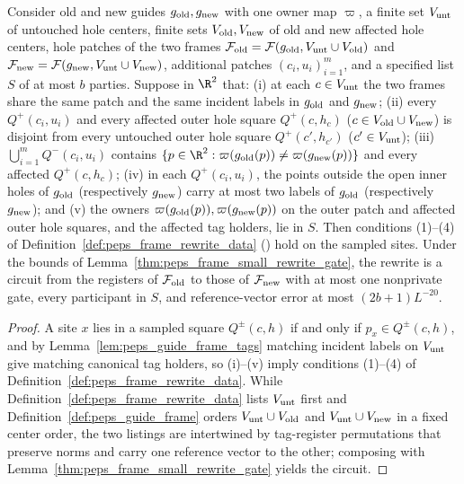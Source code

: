 \begin{lemma}
    \label{thm:peps_guide_frame_rewrite}
    \leanok
    Consider old and new guides $g_{\rm old},g_{\rm new}$ with one owner map $\varpi$, a
    finite set $V_{\rm unt}$ of untouched hole centers, finite sets $V_{\rm old},V_{\rm new}$ of old and new affected
    hole centers, hole patches of the two frames $\mathcal F_{\rm old}=\mathcal F(g_{\rm old},V_{\rm unt}\cup V_{\rm old})$ and $\mathcal F_{\rm new}=\mathcal F(g_{\rm new},V_{\rm unt}\cup V_{\rm new})$, additional
    patches $(c_i,u_i)_{i=1}^m$, and a specified list $S$ of at most $b$ parties. Suppose in $\R^2$ that:
    (i) at each $c\in V_{\rm unt}$ the two frames share the same patch and the same incident labels in $g_{\rm old}$ and $g_{\rm new}$;
    (ii) every $Q^+(c_i,u_i)$ and every affected outer hole square $Q^+(c,h_c)$ ($c\in V_{\rm old}\cup V_{\rm new}$) is disjoint from every untouched outer hole square $Q^+(c',h_{c'})$ ($c'\in V_{\rm unt}$);
    (iii) $\bigcup_{i=1}^m Q^-(c_i,u_i)$ contains $\{p\in\R^2:\varpi(g_{\rm old}(p))\ne\varpi(g_{\rm new}(p))\}$ and every affected $Q^+(c,h_c)$;
    (iv) in each $Q^+(c_i,u_i)$, the points outside the open inner holes of $g_{\rm old}$ (respectively $g_{\rm new}$) carry at most two labels of $g_{\rm old}$ (respectively $g_{\rm new}$); and
    (v) the owners $\varpi(g_{\rm old}(p)),\varpi(g_{\rm new}(p))$ on the outer patch and affected outer hole squares, and the
    affected tag holders, lie in $S$. Then conditions (1)--(4) of Definition~\ref{def:peps_frame_rewrite_data} (\cite[Lemma~6.3]{OpenAI2026PolynomialPEPS}) hold on the sampled sites. Under
    the bounds of Lemma~\ref{thm:peps_frame_small_rewrite_gate}, the rewrite
    is a circuit from the registers of $\mathcal F_{\rm old}$ to those of $\mathcal F_{\rm new}$
    with at most one nonprivate gate, every participant in $S$, and reference-vector error at most $(2b+1)L^{-20}$.
\end{lemma}

\begin{proof}\leanok
    A site $x$ lies in a sampled square $Q^\pm(c,h)$ if and only if $p_x\in Q^\pm(c,h)$, and by Lemma~\ref{lem:peps_guide_frame_tags} matching incident labels on $V_{\rm unt}$ give matching canonical tag holders, so (i)--(v) imply conditions (1)--(4) of Definition~\ref{def:peps_frame_rewrite_data}. While Definition~\ref{def:peps_frame_rewrite_data} lists $V_{\rm unt}$ first and Definition~\ref{def:peps_guide_frame} orders $V_{\rm unt}\cup V_{\rm old}$ and $V_{\rm unt}\cup V_{\rm new}$ in a fixed center order, the two listings are intertwined by tag-register permutations that preserve norms and carry one reference vector to the other; composing with Lemma~\ref{thm:peps_frame_small_rewrite_gate} yields the circuit.
\end{proof}

